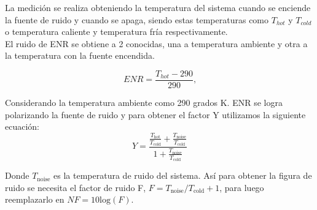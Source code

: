 La medición se realiza obteniendo la temperatura del sistema cuando se enciende la fuente de ruido y cuando se apaga, siendo estas temperaturas como $T_{hot}$ y $T_{cold}$ o temperatura caliente y temperatura fría respectivamente.\\

El ruido de ENR se obtiene a 2  conocidas, una a temperatura ambiente y otra a la temperatura con la fuente encendida.

\begin{equation}
    ENR = \frac{T_{hot} - 290}{290}\text{,}
\end{equation}

Considerando la temperatura ambiente como 290 grados K. ENR se logra polarizando la fuente de ruido y para obtener el factor Y utilizamos la siguiente ecuación:\\

\begin{equation}
    Y = \frac{\frac{T_{\text{hot}}}{T_{\text{cold}}} + \frac{T_{\text{noise}}}{T_{\text{cold}}}}{1 + \frac{T_{\text{noise}}}{T_{\text{cold}}}}
\end{equation}

Donde $T_{\text{noise}}$ es la temperatura de ruido del sistema. Así para obtener la figura de ruido se necesita el factor de ruido F, $F=T_{\text{noise}}/T_{\text{cold}} +1 $, para luego reemplazarlo en $NF = 10\text{log}(F)$\cite{analogNoiseFigure}.\\









